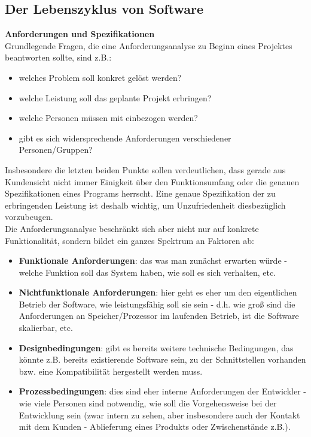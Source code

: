 \documentclass{article}
\begin{document}
\subsection{Der Lebenszyklus von Software}
\textbf{Anforderungen und Spezifikationen} \\
Grundlegende Fragen, die eine Anforderungsanalyse zu Beginn eines Projektes beantworten sollte, sind z.B.:
\begin{itemize}
    \item welches Problem soll konkret gelöst werden?
    \item welche Leistung soll das geplante Projekt erbringen?
    \item welche Personen müssen mit einbezogen werden?
    \item gibt es sich widersprechende Anforderungen verschiedener Personen/Gruppen?
\end{itemize}
Insbesondere die letzten beiden Punkte sollen verdeutlichen, dass gerade aus Kundensicht nicht immer Einigkeit über den Funktionsumfang oder die genauen Spezifikationen eines Programs herrscht. Eine genaue Spezifikation der zu erbringenden Leistung ist deshalb wichtig, um Unzufriedenheit diesbezüglich vorzubeugen. \\
Die Anforderungsanalyse beschränkt sich aber nicht nur auf konkrete Funktionalität, sondern bildet ein ganzes Spektrum an Faktoren ab:
\begin{itemize}
    \item \textbf{Funktionale Anforderungen}: das was man zunächst erwarten würde - welche Funktion soll das System haben, wie soll es sich verhalten, etc. 
    \item \textbf{Nichtfunktionale Anforderungen}: hier geht es eher um den eigentlichen Betrieb der Software, wie leistungsfähig soll sie sein - d.h. wie groß sind die Anforderungen an Speicher/Prozessor im laufenden Betrieb, ist die Software skalierbar, etc. 
    \item \textbf{Designbedingungen}: gibt es bereits weitere technische Bedingungen, das könnte z.B. bereits existierende Software sein, zu der Schnittstellen vorhanden bzw. eine Kompatibilität hergestellt werden muss. 
    \item \textbf{Prozessbedingungen}: dies sind eher interne Anforderungen der Entwickler - wie viele Personen sind notwendig, wie soll die Vorgehensweise bei der Entwicklung sein (zwar intern zu sehen, aber insbesondere auch der Kontakt mit dem Kunden - Ablieferung eines  Produkts oder Zwischenstände z.B.). 
\end{itemize}
\end{document}
